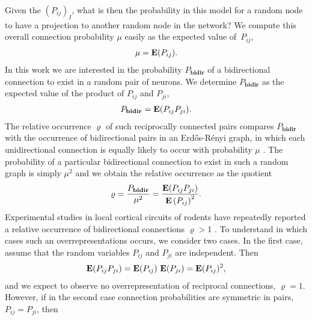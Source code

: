 %
Given the $(P_{ij})_I$, what is then the probability in
this model for a random node to have a projection to another random
node in the network?
%
We compute this overall connection probability $\mu$ easily as the
expected value of~$P_{ij}$,
\begin{align}
\mu = \operatorname{\mathbf{E}}(P_{ij}).
\end{align}
%
%
%
In this work we are interested in the probability $P_{\mathbf{bidir}}$
of a bidirectional connection to exist in a random pair of neurons.
%
We determine $P_{\mathbf{bidir}}$ as the expected value of the product
of $P_{ij}$ and $P_{ji}$,
%
\begin{align}
P_{\mathbf{bidir}} = \operatorname{\mathbf{E}}(P_{ij} P_{ji}).
\end{align}
%
The relative occurrence $\varrho$ of such reciprocally connected pairs compares $P_{\mathbf{bidir}}$ with the occurrence of bidirectional pairs in an Erd\H{o}s-R\'{e}nyi graph, in which each unidirectional connection is equally likely to occur with probability $\mu$ \cite{Gilbert1959, Erdos1959}. The probability of a particular bidirectional connection to exist in such a random graph is simply $\mu^2$ and we obtain the relative occurrence as the quotient
\begin{align}
\varrho = \frac{P_{\mathbf{bidir}}}{\mu^2} = \frac{\operatorname{\mathbf{E}}(P_{ij}P_{ji})}{{\operatorname{\mathbf{E}}\left(P_{ij}\right)}^2}.
\end{align}
%
Experimental studies in local cortical circuits of rodents have repeatedly reported a relative occurrence of bidirectional connections $\varrho > 1$ \cite{Markram1997, Song2005, Perin2011}. To understand in which cases such an overrepresentations occurs, we consider two cases. In the first case, assume that the random variables $P_{ij}$ and $P_{ji}$ are independent. Then
\begin{align}
\operatorname{\mathbf{E}}(P_{ij} P_{ji}) = \operatorname{\mathbf{E}}(P_{ij})\,\operatorname{\mathbf{E}}(P_{ji}) = \operatorname{\mathbf{E}}(P_{ij})^2,
\end{align}
and we expect to observe no overrepresentation of reciprocal connections, $\varrho = 1$. However, if in the second case connection probabilities are symmetric in pairs, $P_{ij} = P_{ji}$, then 
